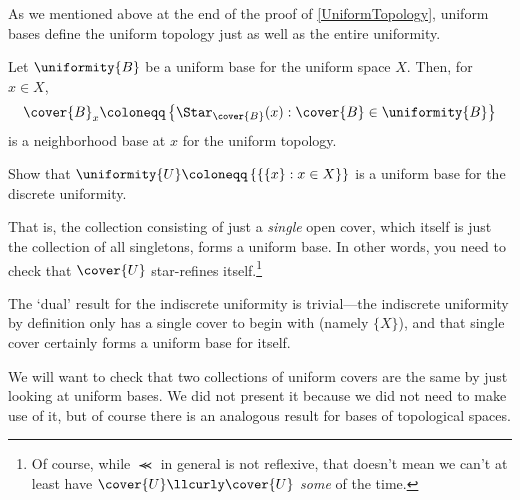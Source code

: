 As we mentioned above at the end of the proof of \cref{UniformTopology}, uniform bases define the uniform topology just as well as the entire uniformity.
\begin{crl}{}{}
Let $\uniformity{B}$ be a uniform base for the uniform space $X$.  Then, for $x\in X$,
\begin{equation}
\cover{B}_x\coloneqq \left\{ \Star _{\cover{B}}(x):\cover{B}\in \uniformity{B}\right\}
\end{equation}
is a neighborhood base at $x$ for the uniform topology.
\end{crl}
\begin{exr}{}{}
Show that $\uniformity{U}\coloneqq \left\{ \left\{ \{ x\} :x\in X\right\} \right\}$ is a uniform base for the discrete uniformity.
\begin{rmk}
That is, the collection consisting of just a \emph{single} open cover, which itself is just the collection of all singletons, forms a uniform base.  In other words, you need to check that $\cover{U}$ star-refines itself.\footnote{Of course, while $\llcurly$ in general is not reflexive, that doesn't mean we can't at least have $\cover{U}\llcurly \cover{U}$ \emph{some} of the time.}
\end{rmk}
\begin{rmk}
The `dual' result for the indiscrete uniformity is trivial---the indiscrete uniformity by definition only has a single cover to begin with (namely $\{ X\}$), and that single cover certainly forms a uniform base for itself.
\end{rmk}
\end{exr}
We will want to check that two collections of uniform covers are the same by just looking at uniform bases.  We did not present it because we did not need to make use of it, but of course there is an analogous result for bases of topological spaces.
